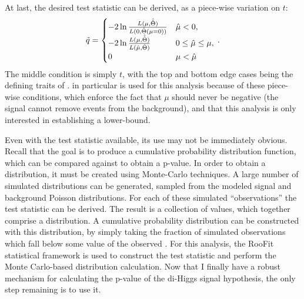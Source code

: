     At last, the desired test statistic \qtil can be derived, as a piece-wise variation on $t$\cite{asymptotic_formulae_for_likelihood}:
    \begin{equation}
        \tilde{q} = \begin{cases}
            -2 \ln{\frac{L(\mu, \hat {\hat \Theta})}{L(0, \hat \Theta(\mu=0))}} & \hat \mu < 0,\\
            -2 \ln{\frac{L(\mu, \hat {\hat \Theta})}{L(\hat \mu, \hat \Theta)}} & 0 \leq \hat \mu \leq \mu,\\
            0 & \mu < \hat \mu 
        \end{cases}
        \,.
    \end{equation}
    The middle condition is simply $t$, with the top and bottom edge cases being the defining traits of \qtil.
    \qtil in particular is used for this analysis because of these piece-wise conditions,
        which enforce the fact that $\mu$ should never be negative (the signal cannot remove events from the background),
        and that this analysis is only interested in establishing a lower-bound.

    Even with the test statistic \qtil available, its use may not be immediately obvious.
    Recall that the goal is to produce a cumulative probability distribution function,
        which can be compared against to obtain a p-value.
    In order to obtain a distribution, it must be created using Monte-Carlo techniques.
    A large number of simulated distributions can be generated,
        sampled from the modeled signal and background Poisson distributions.
    For each of these simulated ``observations'' the test statistic \qtil can be derived.
    The result is a collection of \qtil values, which together comprise a distribution.
    A cumulative probability distribution can be constructed with this distribution,
        by simply taking the fraction of simulated observations which fall below some value of the observed \qtil.
    For this analysis, the RooFit statistical framework is used to construct the test statistic and perform the
        Monte Carlo-based distribution calculation.
    Now that I finally have a robust mechanism for calculating the p-value of the di-Higgs signal hypothesis,
        the only step remaining is to use it.

